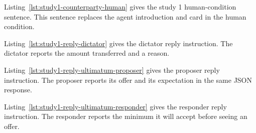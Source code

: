 

Listing~\ref{lst:study1-counterparty-human} gives the study 1 human-condition sentence. This sentence replaces the agent introduction and card in the human condition.


Listing~\ref{lst:study1-reply-dictator} gives the dictator reply instruction. The dictator reports the amount transferred and a reason.


Listing~\ref{lst:study1-reply-ultimatum-proposer} gives the proposer reply instruction. The proposer reports its offer and its expectation in the same JSON response.


Listing~\ref{lst:study1-reply-ultimatum-responder} gives the responder reply instruction. The responder reports the minimum it will accept before seeing an offer.

